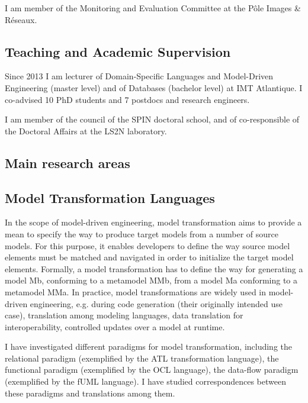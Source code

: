 
I am member of the Monitoring and Evaluation Committee at the Pôle Images \& Réseaux.

\subsection{Teaching and Academic Supervision}

Since 2013 I am lecturer of Domain-Specific Languages and Model-Driven Engineering (master level) and of Databases (bachelor level) at IMT Atlantique. I co-advised 10 PhD students and 7 postdocs and research engineers.

I am member of the council of the SPIN doctoral school, and of co-responsible of the Doctoral Affairs at the LS2N laboratory.

\subsection{Main research areas}

\subsection*{Model Transformation Languages}
In the scope of model-driven engineering, model transformation aims to provide a mean to specify the way to produce target models from a number of source models. For this purpose, it enables developers to define the way source model elements must be matched and navigated in order to initialize the target model elements. Formally, a model transformation has to define the way for generating a model Mb, conforming to a metamodel MMb, from a model Ma conforming to a metamodel MMa. In practice, model transformations are widely used in model-driven engineering, e.g. during code generation (their originally intended use case), translation among modeling languages, data translation for interoperability, controlled updates over a model at runtime.

I have investigated different paradigms for model transformation, including the relational paradigm (exemplified by the ATL transformation language), the functional paradigm (exemplified by the OCL language), the data-flow paradigm (exemplified by the fUML language). I have studied correspondences between these paradigms and translations among them. 

